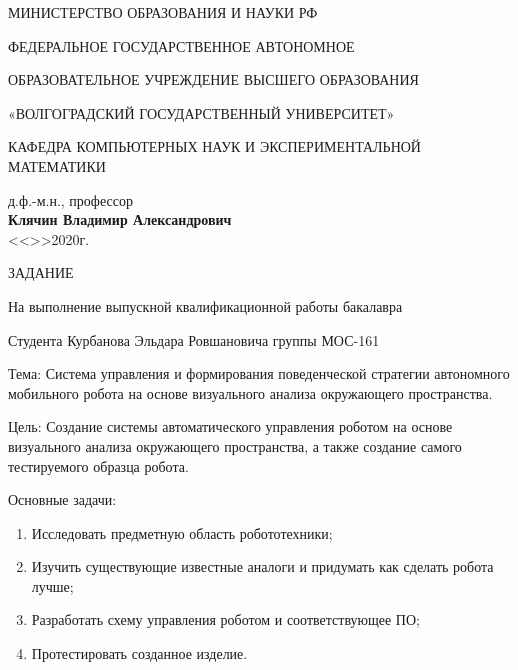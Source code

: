 \thispagestyle{empty}
\begin{center}
	МИНИСТЕРСТВО ОБРАЗОВАНИЯ И НАУКИ РФ
	
	ФЕДЕРАЛЬНОЕ ГОСУДАРСТВЕННОЕ АВТОНОМНОЕ 
	
	ОБРАЗОВАТЕЛЬНОЕ УЧРЕЖДЕНИЕ ВЫСШЕГО ОБРАЗОВАНИЯ
	
	«ВОЛГОГРАДСКИЙ ГОСУДАРСТВЕННЫЙ УНИВЕРСИТЕТ»
	
	КАФЕДРА КОМПЬЮТЕРНЫХ НАУК И ЭКСПЕРИМЕНТАЛЬНОЙ МАТЕМАТИКИ	
\end{center}

\vspace{0.5cm}

\hfill\begin{minipage}{0.51\textwidth}
	д.ф.-м.н., профессор \\
	\textbf{Клячин Владимир Александрович} \\
	<<\underline{\hspace{1cm}}>>\underline{\hspace{5cm}}2020г.
\end{minipage}

\vspace{1cm}

\begin{center}
ЗАДАНИЕ

На выполнение выпускной квалификационной работы бакалавра

Студента Курбанова Эльдара Ровшановича группы МОС-161
\end{center}

\vspace{0.3cm}

\noindent Тема: Система управления и формирования поведенческой стратегии автономного мобильного
робота на основе визуального анализа окружающего пространства.

\noindent Цель: Создание системы автоматического управления роботом на основе визуального анализа окружающего пространства, а также создание самого тестируемого образца робота.

\noindent Основные задачи:

\begin{enumerate}
	\item Исследовать предметную область робототехники;
	\item Изучить существующие известные аналоги и придумать как сделать робота лучше;
	\item Разработать схему управления роботом и соответствующее ПО;
	\item Протестировать созданное изделие.
\end{enumerate}	

